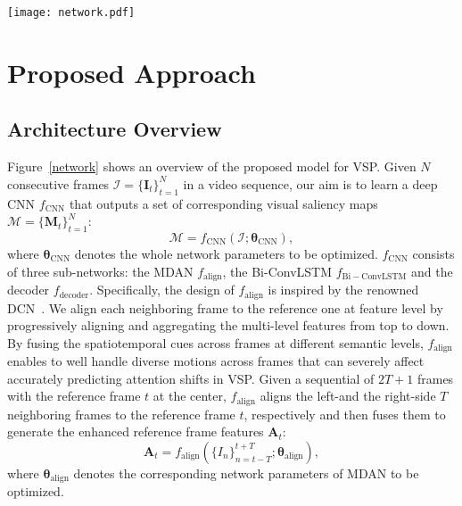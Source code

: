 \documentclass[review]{elsarticle}
\begin{document}
\begin{figure*}[t]
\centering
\texttt{[image: network.pdf]}
\caption{Overview of the proposed VSP framework. Firstly, a sequence of video frames are fed into the MDAN to align the reference and its neighboring frames, yielding the aligned features that can well capture short-term spatiotemporal information. Then, the aligned features are sent to the Bi-ConvLSTM, generating the features that encodes long-term spatiotemporal information. Finally, the output features are decoded to generate the predicted saliency map.}
\label{network}
\end{figure*}
\section{Proposed Approach}

\subsection{Architecture Overview}\label{sec:overview}
Figure~\ref{network} shows an overview of the proposed model for VSP.
Given $N$ consecutive frames $\mathcal{I}=\{\bm{I}_t\}_{t=1}^N$ in a video sequence, our aim is to learn a deep CNN $f_{\mathrm{CNN}}$ that outputs a set of corresponding visual saliency maps $\mathcal{M}=\{\bm{M}_t\}_{t=1}^N$:
\begin{equation}
\mathcal{M}=f_{\mathrm{CNN}}(\mathcal{I};\bm{\theta}_{\mathrm{CNN}}),
\end{equation}
where $\bm{\theta}_{\mathrm{CNN}}$ denotes the whole network parameters to be optimized.
$f_{\mathrm{CNN}}$ consists of three sub-networks: the MDAN $f_{\mathrm{align}}$, the Bi-ConvLSTM $f_{\mathrm{Bi-ConvLSTM}}$ and the decoder $f_{\mathrm{decoder}}$.
Specifically, the design of $f_{\mathrm{align}}$ is inspired by the renowned DCN~\cite{dai2017deformable,zhu2019deformable}. We align each neighboring frame to the reference one at feature level by progressively aligning and aggregating the multi-level features from top to down.
By fusing the spatiotemporal cues across frames at different semantic levels, $f_{\mathrm{align}}$ enables to well handle diverse motions across frames that can severely affect accurately predicting attention shifts in VSP.
Given a sequential of $2T+1$ frames with the reference frame $t$ at the center, $f_{\mathrm{align}}$ aligns the left-and the right-side $T$ neighboring frames to the reference frame $t$, respectively and then fuses them to generate the enhanced reference frame features ${\bm{A}}_t$:
\begin{equation}
\label{eq:align}
{\bm{A}}_t=f_{\mathrm{align}}(\{I_n\}_{n={t-T}}^{t+T};\bm{\theta}_{\mathrm{align}}),
\end{equation}
where $\bm{\theta}_{\mathrm{align}}$ denotes the corresponding network parameters of MDAN to be optimized.
\end{document}

